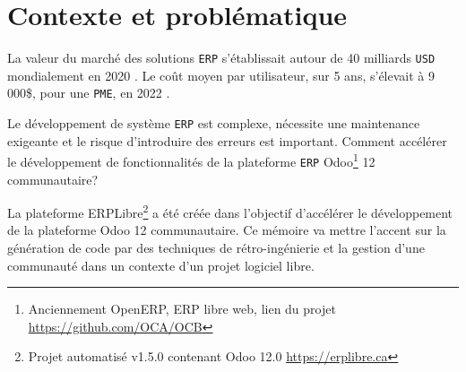 \label{sec:Introduction}  %


\section{Contexte et problématique}

La valeur du marché des solutions \texttt{ERP} s'établissait autour de 40 milliards \texttt{USD} mondialement en 2020 \cite{mordorintelligence_erp_2023,bigbang_erp_2023}. Le coût moyen par utilisateur, sur 5 ans, s'élevait à 9 000\$, pour une \texttt{PME}, en 2022 \cite{softwarepath_erp_2023}.

Le développement de système \texttt{ERP} est complexe, nécessite une maintenance exigeante et le risque d’introduire des erreurs est important. Comment accélérer le développement de fonctionnalités de la plateforme \texttt{ERP} Odoo\footnote{Anciennement OpenERP, ERP libre web, lien du projet \url{https://github.com/OCA/OCB}} 12 communautaire?

La plateforme ERPLibre\footnote{Projet automatisé v1.5.0 contenant Odoo 12.0 \url{https://erplibre.ca}} a été créée dans l’objectif d’accélérer le développement de la plateforme Odoo 12 communautaire. Ce mémoire va mettre l’accent sur la génération de code par des techniques de rétro-ingénierie et la gestion d’une communauté dans un contexte d’un projet logiciel libre.





